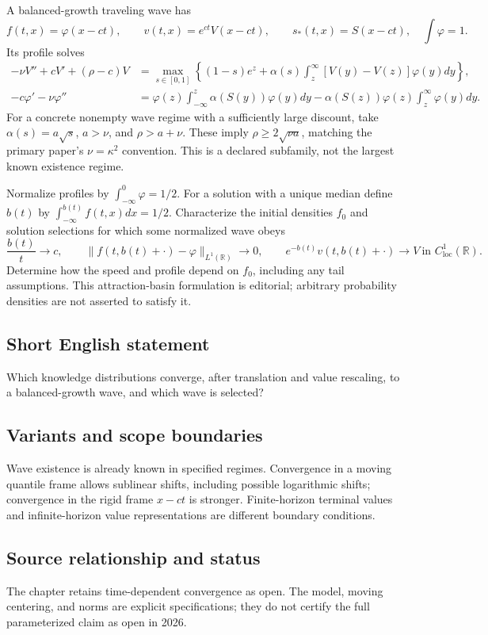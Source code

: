 \documentclass[11pt,a4paper]{article}
\begin{document}
A balanced-growth traveling wave has
\[
 f(t,x)=\varphi(x-ct),\qquad v(t,x)=e^{ct}V(x-ct),\qquad
 s_*(t,x)=S(x-ct),\quad \int\varphi=1.
\]
Its profile solves
\[
 \begin{split}
 -\nu V''+cV'+(\rho-c)V
 &=\max_{s\in[0,1]}\left\{(1-s)e^z+
 \alpha(s)\int_z^\infty[V(y)-V(z)]\varphi(y)dy\right\},\\
 -c\varphi'-\nu\varphi''
 &=\varphi(z)\int_{-\infty}^z\alpha(S(y))\varphi(y)dy
  -\alpha(S(z))\varphi(z)\int_z^\infty\varphi(y)dy.
 \end{split}
\]
For a concrete nonempty wave regime with a sufficiently large discount, take $\alpha(s)=a\sqrt{s}$, $a>\nu$, and $\rho>a+\nu$. These imply $\rho\geq2\sqrt{\nu a}$, matching the primary paper's $\nu=\kappa^2$ convention. This is a declared subfamily, not the largest known existence regime.

Normalize profiles by $\int_{-\infty}^0\varphi=1/2$. For a solution with a unique median define $b(t)$ by $\int_{-\infty}^{b(t)}f(t,x)dx=1/2$. Characterize the initial densities $f_0$ and solution selections for which some normalized wave obeys
\[
 \frac{b(t)}t\longrightarrow c,\qquad
 \|f(t,b(t)+\cdot)-\varphi\|_{L^1(\mathbb R)}\longrightarrow0,\qquad
 e^{-b(t)}v(t,b(t)+\cdot)\longrightarrow V
 \ \text{in }C^1_{\mathrm{loc}}(\mathbb R).
\]
Determine how the speed and profile depend on $f_0$, including any tail assumptions. This attraction-basin formulation is editorial; arbitrary probability densities are not asserted to satisfy it.
\subsection*{Short English statement}
Which knowledge distributions converge, after translation and value rescaling, to a balanced-growth wave, and which wave is selected?
\subsection*{Variants and scope boundaries}
Wave existence is already known in specified regimes. Convergence in a moving quantile frame allows sublinear shifts, including possible logarithmic shifts; convergence in the rigid frame $x-ct$ is stronger. Finite-horizon terminal values and infinite-horizon value representations are different boundary conditions.
\subsection*{Source relationship and status}
The chapter retains time-dependent convergence as open. The model, moving centering, and norms are explicit specifications; they do not certify the full parameterized claim as open in 2026.
\end{document}
